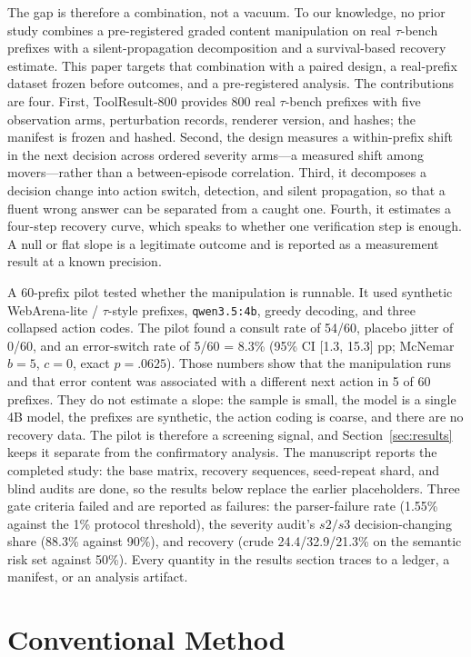 \documentclass[a4paper,fleqn]{cas-sc}
\begin{document}
The gap is therefore a combination, not a vacuum. To our knowledge, no prior study combines
a pre-registered graded content manipulation on real $\tau$-bench prefixes with a
silent-propagation decomposition and a survival-based recovery estimate. This
paper targets that combination with a paired design, a real-prefix dataset frozen before outcomes, and a
pre-registered analysis. The contributions are four. First, ToolResult-800 provides 800 real $\tau$-bench
prefixes with five observation arms, perturbation records, renderer version, and hashes; the
manifest is frozen and hashed. Second, the design measures a within-prefix shift in the next decision
across ordered severity arms---a measured shift among movers---rather than a between-episode
correlation. Third, it decomposes a decision change into action switch, detection, and silent
propagation, so that a fluent wrong answer can be separated from a caught one. Fourth, it
estimates a four-step recovery curve, which speaks to whether one verification step is enough. A
null or flat slope is a legitimate outcome and is reported as a measurement result at a known
precision.

A 60-prefix pilot tested whether the manipulation is runnable. It used synthetic WebArena-lite /
$\tau$-style prefixes, \texttt{qwen3.5:4b}, greedy decoding, and three collapsed action codes. The
pilot found a consult rate of 54/60, placebo jitter of 0/60, and an error-switch rate of
5/60 = 8.3\% (95\% CI [1.3, 15.3] pp; McNemar $b=5$, $c=0$, exact $p=.0625$). Those numbers show
that the manipulation runs and that error content was associated with a different next action in
5 of 60 prefixes. They do not estimate
a slope: the sample is small, the model is a single 4B model, the prefixes are synthetic, the
action coding is coarse, and there are no recovery data. The pilot is therefore a screening
signal, and Section~\ref{sec:results} keeps it separate from the confirmatory analysis. The
manuscript reports the completed study: the base matrix, recovery sequences, seed-repeat
shard, and blind audits are done, so the results below replace the earlier placeholders. Three
gate criteria failed and are reported as failures: the parser-failure rate (1.55\% against the 1\%
protocol threshold), the severity audit's $s2/s3$ decision-changing share (88.3\% against 90\%),
and recovery (crude 24.4/32.9/21.3\% on the semantic risk set against 50\%). Every quantity in the results section
traces to a ledger, a manifest, or an analysis artifact.

\section{Conventional Method}\label{sec:conventional}
\end{document}
